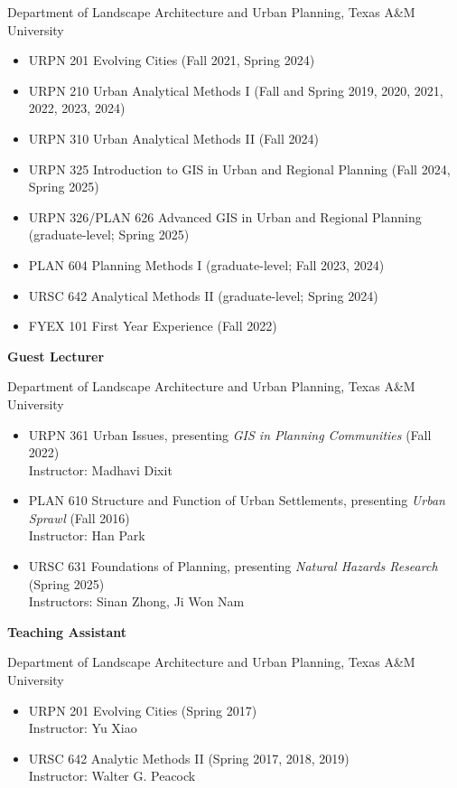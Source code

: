 \documentclass[11pt,oneside]{article}
\begin{document}
{Department of Landscape Architecture and Urban Planning, Texas A\&M University}
\begin{itemize}[leftmargin=20pt]
\item URPN 201 Evolving Cities (Fall 2021, Spring 2024)
\item URPN 210 Urban Analytical Methods I (Fall and Spring 2019, 2020, 2021, 2022, 2023, 2024)
\item URPN 310 Urban Analytical Methods II (Fall 2024)
\item URPN 325 Introduction to GIS in Urban and Regional Planning (Fall 2024, Spring 2025)
\item URPN 326/PLAN 626 Advanced GIS in Urban and Regional Planning (graduate-level; Spring 2025)
\item PLAN 604 Planning Methods I (graduate-level; Fall 2023, 2024)
\item URSC 642 Analytical Methods II (graduate-level; Spring 2024)
\item FYEX 101 First Year Experience (Fall 2022)
\end{itemize}

\newpage
\pagestyle{main}

\textbf{Guest Lecturer}

\vspace{3pt}

{Department of Landscape Architecture and Urban Planning, Texas A\&M University}
\begin{itemize}[leftmargin=20pt]
\item URPN 361 Urban Issues, presenting \emph{GIS in Planning Communities} (Fall 2022)\\
      Instructor: Madhavi Dixit
\item PLAN 610 Structure and Function of Urban Settlements, presenting \emph{Urban Sprawl} (Fall 2016)\\
      Instructor: Han Park
\item URSC 631 Foundations of Planning, presenting \emph{Natural Hazards Research} (Spring 2025)\\
      Instructors: Sinan Zhong, Ji Won Nam
\end{itemize}

\vspace{3pt}

\textbf{Teaching Assistant}

\vspace{3pt}

{Department of Landscape Architecture and Urban Planning, Texas A\&M University}
\begin{itemize}[leftmargin=20pt]
\item URPN 201 Evolving Cities (Spring 2017)\\
      Instructor: Yu Xiao
\item URSC 642 Analytic Methods II (Spring 2017, 2018, 2019)\\
      Instructor: Walter G. Peacock
\end{itemize}
\end{document}
